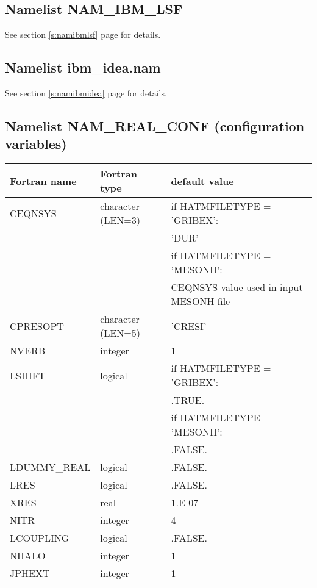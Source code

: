 \subsection{Namelist NAM\_IBM\_LSF}
See section \ref{s:namibmlsf} page \pageref{s:namibmlsf} for details.

\subsection{Namelist ibm\_idea.nam}
See section \ref{s:namibmidea} page \pageref{s:namibmidea} for details.

\subsection{Namelist NAM\_REAL\_CONF  (configuration variables)}

\begin{center}
\begin{tabular} {|l|l|l|}
\hline
Fortran name & Fortran type & default value\\
\hline
\hline
CEQNSYS       & character (LEN=3)  &if HATMFILETYPE = 'GRIBEX': \\
 & & \hspace*{0.5cm}'DUR' \\
              &                    & if HATMFILETYPE = 'MESONH': \\
 & & \hspace*{0.5cm} CEQNSYS value used in input MESONH file\\
CPRESOPT      & character (LEN=5)  & 'CRESI' \\
NVERB         & integer            & 1      \\
LSHIFT        & logical            & if HATMFILETYPE = 'GRIBEX':  \\
 & & \hspace*{0.5cm}.TRUE. \\
              &                    & if HATMFILETYPE = 'MESONH': \\
 & & \hspace*{0.5cm}.FALSE. \\
LDUMMY\_REAL  & logical            & .FALSE.                     \\
LRES          & logical            & .FALSE.                     \\
XRES          & real               & 1.E-07                      \\
NITR          & integer            & 4                           \\
LCOUPLING     & logical            & .FALSE.                     \\
NHALO      & integer        & 1      \\
JPHEXT     & integer        & 1      \\
\hline
\end{tabular}
\end{center}

